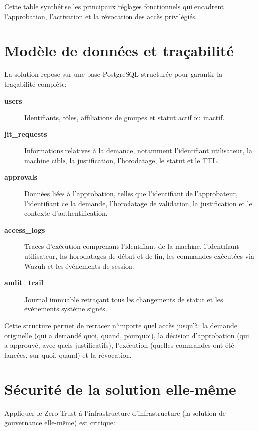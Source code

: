 Cette table synthétise les principaux réglages fonctionnels qui encadrent l'approbation, l'activation et la révocation des accès privilégiés.

\section{Modèle de données et traçabilité}

La solution repose sur une base PostgreSQL structurée pour garantir la traçabilité complète:

\begin{description}
	\item[\textbf{users}] Identifiants, rôles, affiliations de groupes et statut actif ou inactif.

	\item[\textbf{jit\_requests}] Informations relatives à la demande, notamment l'identifiant utilisateur, la machine cible, la justification, l'horodatage, le statut et le TTL.

	\item[\textbf{approvals}] Données liées à l'approbation, telles que l'identifiant de l'approbateur, l'identifiant de la demande, l'horodatage de validation, la justification et le contexte d'authentification.

	\item[\textbf{access\_logs}] Traces d'exécution comprenant l'identifiant de la machine, l'identifiant utilisateur, les horodatages de début et de fin, les commandes exécutées via Wazuh et les événements de session.

	\item[\textbf{audit\_trail}] Journal immuable retraçant tous les changements de statut et les événements système signés.
\end{description}

Cette structure permet de retracer n'importe quel accès jusqu'à: la demande originelle (qui a demandé quoi, quand, pourquoi), la décision d'approbation (qui a approuvé, avec quels justificatifs), l'exécution (quelles commandes ont été lancées, sur quoi, quand) et la révocation.

\section{Sécurité de la solution elle-même}

Appliquer le Zero Trust à l'infrastructure d'infrastructure (la solution de gouvernance elle-même) est critique:

